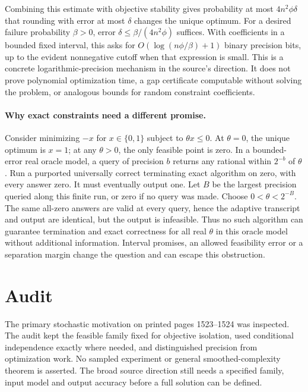 \documentclass[11pt]{article}
\begin{document}
Combining this estimate with objective stability gives probability
at most $4n^2\phi\delta$ that rounding with error at most
$\delta$ changes the unique optimum. For a desired failure
probability $\beta>0$, error
$\delta\le\beta/(4n^2\phi)$ suffices. With coefficients
in a bounded fixed interval, this asks for
$O(\log(n\phi/\beta)+1)$ binary precision bits, up to
the evident nonnegative cutoff when that expression is small.
This is a concrete logarithmic-precision mechanism in the source's
direction. It does not prove polynomial optimization time, a gap
certificate computable without solving the problem, or analogous
bounds for random constraint coefficients.

\paragraph{Why exact constraints need a different promise.}
Consider minimizing $-x$ for $x\in\{0,1\}$ subject to
$\theta x\le0$. At $\theta=0$, the unique optimum is
$x=1$; at any $\theta>0$, the only feasible point is zero.
In a bounded-error real oracle model, a query of precision $b$
returns any rational within $2^{-b}$ of $\theta$. Run a
purported universally correct terminating exact algorithm on zero,
with every answer zero. It must eventually output one. Let $B$
be the largest precision queried along this finite run, or zero
if no query was made. Choose
$0<\theta<2^{-B}$. The same all-zero answers are valid at
every query, hence the adaptive transcript and output are identical,
but the output is infeasible. Thus no such algorithm can guarantee
termination and exact correctness for all real $\theta$ in this
oracle model without additional information. Interval promises, an
allowed feasibility error or a separation margin change the question
and can escape this obstruction.

\section{Audit}
The primary stochastic motivation on printed pages 1523--1524 was
inspected. The audit kept the feasible family fixed for objective
isolation, used conditional independence exactly where needed, and
distinguished precision from optimization work. No sampled experiment
or general smoothed-complexity theorem is asserted. The broad source
direction still needs a specified family, input model and output
accuracy before a full solution can be defined.
\end{document}
